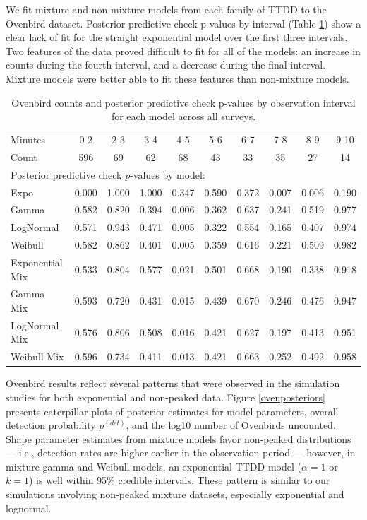 \documentclass[useAMS,usenatbib,referee,12pt]{article}
\begin{document}
We fit mixture and non-mixture models from each family of TTDD to the Ovenbird dataset.  Posterior predictive check p-values by interval (Table \ref{tbl:ovencounts}) show a clear lack of fit for the straight exponential model over the first three intervals.  Two features of the data proved difficult to fit for all of the models: an increase in counts during the fourth interval, and a decrease during the final interval.  Mixture models were better able to fit these features than non-mixture models.

\begin{table}[ht]
\centering
\begin{tabular}{lccccccccc}
  \hline
Minutes & 0-2 & 2-3 & 3-4 & 4-5 & 5-6 & 6-7 & 7-8 & 8-9 & 9-10 \\ 
Count & 596 & 69 & 62 & 68 & 43 & 33 & 35 & 27 & 14 \\ 
\hline
\multicolumn{10}{l}{Posterior predictive check $p$-values by model:}\\
\hline
Expo & 0.000 & 1.000 & 1.000 & 0.347 & 0.590 & 0.372 & 0.007 & 0.006 & 0.190 \\ 
  Gamma & 0.582 & 0.820 & 0.394 & 0.006 & 0.362 & 0.637 & 0.241 & 0.519 & 0.977 \\ 
  LogNormal & 0.571 & 0.943 & 0.471 & 0.005 & 0.322 & 0.554 & 0.165 & 0.407 & 0.974 \\ 
  Weibull & 0.582 & 0.862 & 0.401 & 0.005 & 0.359 & 0.616 & 0.221 & 0.509 & 0.982 \\ 
  Exponential Mix & 0.533 & 0.804 & 0.577 & 0.021 & 0.501 & 0.668 & 0.190 & 0.338 & 0.918 \\ 
  Gamma Mix & 0.593 & 0.720 & 0.431 & 0.015 & 0.439 & 0.670 & 0.246 & 0.476 & 0.947 \\ 
  LogNormal Mix & 0.576 & 0.806 & 0.508 & 0.016 & 0.421 & 0.627 & 0.197 & 0.413 & 0.951 \\ 
  Weibull Mix & 0.596 & 0.734 & 0.411 & 0.013 & 0.421 & 0.663 & 0.252 & 0.492 & 0.958 \\ 
   \hline
\end{tabular}
\caption{\label{tbl:ovencounts} Ovenbird counts and posterior predictive check p-values by observation interval for each model across all surveys.}
\end{table}

Ovenbird results reflect several patterns that were observed in the simulation studies for both exponential and non-peaked data.  Figure \ref{ovenposteriors} presents caterpillar plots of posterior estimates for model parameters, overall detection probability $p^{(det)}$, and the log10 number of Ovenbirds uncounted.  Shape parameter estimates from mixture models favor non-peaked distributions --- i.e., detection rates are higher earlier in the observation period --- however, in mixture gamma and Weibull models, an exponential TTDD model ($\alpha=1$ or $k=1$) is well within 95\% credible intervals.  These pattern is similar to our simulations involving non-peaked mixture datasets, especially exponential and lognormal.
\end{document}
